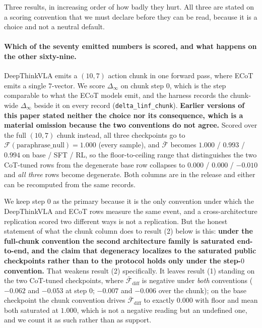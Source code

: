 \documentclass{article}
\begin{document}
Three results, in increasing order of how badly they hurt. All three are stated on a scoring convention that we must declare before they can be read, because it is a choice and not a neutral default.

\paragraph{Which of the seventy emitted numbers is scored, and what happens on the other sixty-nine.} DeepThinkVLA emits a $(10,7)$ action chunk in one forward pass, where ECoT emits a single $7$-vector. We score $\Delta_\infty$ on chunk step $0$, which is the step comparable to what the ECoT models emit, and the harness records the chunk-wide $\Delta_\infty$ beside it on every record (\texttt{delta\_linf\_chunk}). \textbf{Earlier versions of this paper stated neither the choice nor its consequence, which is a material omission because the two conventions do not agree.} Scored over the full $(10,7)$ chunk instead, all three checkpoints go to $\mathcal{F}(\text{paraphrase\_null}) = 1.000$ (every sample), and $\bar{\mathcal{F}}$ becomes $1.000$ / $0.993$ / $0.994$ on base / SFT / RL, so the floor-to-ceiling range that distinguishes the two CoT-tuned rows from the degenerate base row collapses to $0.000$ / $0.000$ / $-0.010$ and \emph{all three} rows become degenerate. Both columns are in the release and either can be recomputed from the same records.

We keep step $0$ as the primary because it is the only convention under which the DeepThinkVLA and ECoT rows measure the same event, and a cross-architecture replication scored two different ways is not a replication. But the honest statement of what the chunk column does to result (2) below is this: \textbf{under the full-chunk convention the second architecture family is saturated end-to-end, and the claim that degeneracy localizes to the saturated public checkpoints rather than to the protocol holds only under the step-$0$ convention.} That weakens result (2) specifically. It leaves result (1) standing on the two CoT-tuned checkpoints, where $\bar{\mathcal{F}}_{\text{diff}}$ is negative under \emph{both} conventions ($-0.062$ and $-0.053$ at step $0$; $-0.007$ and $-0.006$ over the chunk); on the base checkpoint the chunk convention drives $\bar{\mathcal{F}}_{\text{diff}}$ to exactly $0.000$ with floor and mean both saturated at $1.000$, which is not a negative reading but an undefined one, and we count it as such rather than as support.
\end{document}
